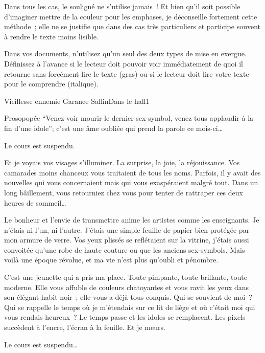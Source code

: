 \documentclass{parch}
\begin{document}
\begin{multicols}{3}
\begin{spacing}{1}
		Dans tous les cas, le souligné ne s'utilise jamais ! Et bien qu'il soit possible d'imaginer mettre de la couleur pour les emphases, je déconseille fortement cette méthode ; elle ne se justifie que dans des cas très particuliers et participe souvent à rendre le texte moins lisible.
		
		Dans vos documents, n'utilisez qu'un seul des deux types de mise en exergue. Définissez à l'avance si le lecteur doit pouvoir voir immédiatement de quoi il retourne sans forcément lire le texte (gras) ou si le lecteur doit lire votre texte pour le comprendre (italique).
		
		
			\end{spacing}
		\end{multicols}
	
	\newpage
	
	\begin{parchArticle}{Vieillesse ennemie}
		{Garance Sallin}{Dans le hall}{1}
		\begin{parchResumeTheme}{Prosopopée}
			\enquote{Venez voir mourir le dernier sex-symbol, venez tous applaudir à la fin d’une idole}; c’est une âme oubliée qui prend la parole ce mois-ci…
		\end{parchResumeTheme}
		
		
		Le cours est suspendu.
		
		Et je voyais vos visages s’illuminer. La surprise, la joie, la réjouissance. Vos camarades moins chanceux vous traitaient de tous les noms. Parfois, il y avait des nouvelles qui vous concernaient mais qui vous exaspéraient malgré tout. Dans un long bâillement, vous retourniez chez vous pour tenter de rattraper ces deux heures de sommeil…
		
		Le bonheur et l’envie de transmettre anime les artistes comme les enseignants. Je n’étais ni l’un, ni l’autre. J’étais une simple feuille de papier bien protégée par mon armure de verre. Vos yeux plissés se reflétaient sur la vitrine, j’étais aussi convoitée qu’une robe de haute couture ou que les anciens sex-symbols. Mais voilà une époque révolue, et ma vie n’est plus qu’oubli et pénombre.
		
		C’est une jeunette qui a pris ma place. Toute pimpante, toute brillante, toute moderne. Elle vous affuble de couleurs chatoyantes et vous ravit les yeux dans son élégant habit noir ; elle vous a déjà tous conquis. Qui se souvient de moi ? Qui se rappelle le temps où je m’étendais sur ce lit de liège et où c’était moi qui vous rendais heureux ? Le temps passe et les idoles se remplacent. Les pixels succèdent à l’encre, l’écran à la feuille. Et je meurs.
		
		Le cours est suspendu…
	\end{parchArticle}
	
\end{document}
